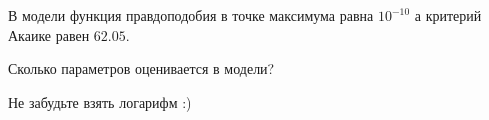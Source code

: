 
\begin{question}
В модели функция правдоподобия в точке максимума равна \(10^{-10}\) а критерий Акаике равен \(62.05\).

Сколько параметров оценивается в модели?
\end{question}

\begin{solution}
Не забудьте взять логарифм :)
\end{solution}

